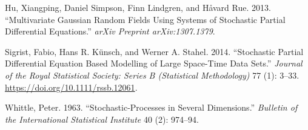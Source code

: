\documentclass{article}
\begin{document}
\hypertarget{refs}{}
\leavevmode\hypertarget{ref-hu2013multivariate}{}%
Hu, Xiangping, Daniel Simpson, Finn Lindgren, and Håvard Rue. 2013.
``Multivariate Gaussian Random Fields Using Systems of Stochastic
Partial Differential Equations.'' \emph{arXiv Preprint arXiv:1307.1379}.

\leavevmode\hypertarget{ref-Sigrist2014}{}%
Sigrist, Fabio, Hans R. Künsch, and Werner A. Stahel. 2014. ``Stochastic
Partial Differential Equation Based Modelling of Large Space-Time Data
Sets.'' \emph{Journal of the Royal Statistical Society: Series B
(Statistical Methodology)} 77 (1): 3--33.
\url{https://doi.org/10.1111/rssb.12061}.

\leavevmode\hypertarget{ref-whittle1963stochastic}{}%
Whittle, Peter. 1963. ``Stochastic-Processes in Several Dimensions.''
\emph{Bulletin of the International Statistical Institute} 40 (2):
974--94.



\end{document}

